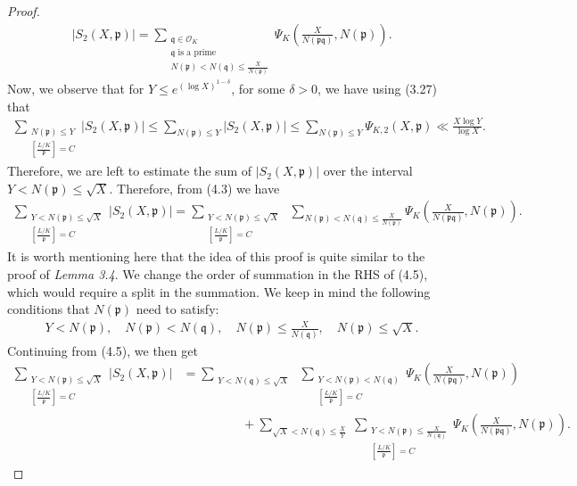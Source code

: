 \documentclass[12pt]{article}
\numberwithin{equation}{section}
\numberwithin{equation}{section}
\begin{document}
\begin{proof}
\begin{align}
        |S_2(X,\mathfrak{p})| = \sum_{\substack{\mathfrak{q} \in \mathcal{O}_K \\ \mathfrak{q} \text{ is a prime} \\N(\mathfrak{p})<N(\mathfrak{q})\leq \frac{X}{N(\mathfrak{p})}}} \Psi_K\left(\frac{X}{N(\mathfrak{pq})},N(\mathfrak{p})\right).
    \end{align} 
    Now, we observe that for $Y \leq e^{(\log X)^{1-\delta}}$, for some $\delta  >0$, we have using (3.27) that
    \begin{align}
        \sum_{\substack{N(\mathfrak{p}) \leq Y \\ \left[\frac{L/K}{\mathfrak{p}}\right] =C}} |S_2(X,\mathfrak{p})| \leq \sum_{N(\mathfrak{p}) \leq Y} |S_2(X,\mathfrak{p})| \leq   \sum_{N(\mathfrak{p})\leq Y} \Psi_{K,2}\left({X},\mathfrak{p}\right) \ll \frac{X\log Y}{\log X}.
    \end{align}
        Therefore, we are left to estimate the sum of $|S_2(X,\mathfrak{p})|$ over the interval $Y<N(\mathfrak{p})\leq \sqrt{X}$. Therefore, from (4.3) we have
        \begin{align}
            \sum_{\substack{Y<N(\mathfrak{p}) \leq \sqrt{X} \\ \left[\frac{L/K}{\mathfrak{p}}\right] =C}} |S_2(X,\mathfrak{p})| = \sum_{\substack{Y<N(\mathfrak{p}) \leq \sqrt{X} \\ \left[\frac{L/K}{\mathfrak{p}}\right] =C}}\; \sum_{N(\mathfrak{p})<N(\mathfrak{q})\leq \frac{X}{N(\mathfrak{p})}} \Psi_K\left(\frac{X}{N(\mathfrak{p}\mathfrak{q})},N(\mathfrak{p})\right).
        \end{align}
        It is worth mentioning here that the idea of this proof is quite similar to the proof of \textit{Lemma 3.4}. We change the order of summation in the RHS of (4.5), which would require a split in the summation. We keep in mind the following conditions that $N(\mathfrak{p})$ need to satisfy:
        \begin{align}
            Y<N(\mathfrak{p}), \quad N(\mathfrak{p})<N(\mathfrak{q}), \quad N(\mathfrak{p})\leq \frac{X}{N(\mathfrak{q})},\quad N(\mathfrak{p}) \leq \sqrt{X} .\nonumber
        \end{align}
        Continuing from (4.5), we then get 
        \begin{align}
            \sum_{\substack{Y<N(\mathfrak{p}) \leq \sqrt{X} \\ \left[\frac{L/K}{\mathfrak{p}}\right] =C}} |S_2(X,\mathfrak{p})| &= \sum_{\substack{Y <N(\mathfrak{q}) \leq \sqrt{X}}} \;  \sum_{\substack{Y<N(\mathfrak{p})<N(\mathfrak{q}) \\ \left[\frac{L/K}{\mathfrak{p}}\right] =C}} \Psi_K\left(\frac{X}{N(\mathfrak{p}\mathfrak{q})},N(\mathfrak{p})\right) \nonumber \\ &\hspace{2cm}+ \sum_{\sqrt{X} < N(\mathfrak{q}) \leq \frac{X}{Y}} \;\sum_{\substack{Y<N(\mathfrak{p})\leq \frac{X}{N(\mathfrak{q})} \\ \left[\frac{L/K}{\mathfrak{p}}\right] =C} } \Psi_K\left(\frac{X}{N(\mathfrak{p}\mathfrak{q})},N(\mathfrak{p})\right) .

\end{align}
\end{proof}
\end{document}
